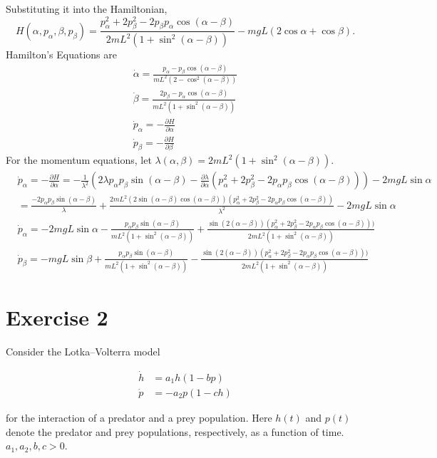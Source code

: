 \documentclass[a4paper,11pt,pdftex]{article}
\begin{document}
Substituting it into the Hamiltonian,
$$
H(\alpha, p_\alpha, \beta, p_\beta) = \frac{p^2_\alpha + 2p^2_\beta - 2p_\beta p_\alpha\cos(\alpha-\beta)}{2mL^2(1+\sin^2(\alpha - \beta))}- mgL(2\cos \alpha + \cos \beta).
$$
Hamilton's Equations are
\begin{align*}
    \dot{\alpha} = \frac{p_\alpha- p_\beta \cos(\alpha-\beta)}{mL^2(2-\cos^2(\alpha - \beta))} \\
    \dot{\beta} = \frac{2p_\beta - p_\alpha \cos(\alpha-\beta)}{mL^2(1+\sin^2(\alpha - \beta))}\\
    \dot{p}_\alpha = -\frac{\partial H}{\partial \alpha} \\
    \dot{p}_\beta = -\frac{\partial H}{\partial \beta} 
\end{align*}
For the momentum equations, let $\lambda(\alpha, \beta) = 2mL^2(1+\sin^2(\alpha - \beta))$.
\begin{align*}
&\dot{p}_\alpha = -\frac{\partial H}{\partial \alpha}= -\frac{1}{\lambda^2}\left(2\lambda p_\alpha p_\beta \sin(\alpha -\beta ) - \frac{\partial \lambda}{\partial \alpha}(p^2_\alpha + 2p^2_\beta-2p_\alpha p_\beta \cos(\alpha-\beta))\right) - 2mgL\sin \alpha \\
& = \frac{-2p_\alpha p_\beta \sin(\alpha - \beta)}{\lambda}+ \frac{2mL^2(2\sin(\alpha-\beta)\cos(\alpha-\beta))(p^2_\alpha + 2p^2_\beta-2p_\alpha p_\beta \cos(\alpha-\beta))}{\lambda^2} - 2mgL\sin \alpha \\
& \dot{p}_\alpha = -2mgL \sin \alpha- \frac{p_\alpha p_\beta \sin(\alpha -\beta)}{mL^2 (1+\sin^2(\alpha-\beta))} + \frac{\sin(2(\alpha-\beta))(p^2_\alpha + 2p^2_\beta-2p_\alpha p_\beta \cos(\alpha-\beta)))}{2mL^2 (1+\sin^2(\alpha-\beta))} \\
&\dot{p}_\beta = -mgL\sin\beta + \frac{p_\alpha p_\beta \sin(\alpha -\beta)}{mL^2 (1+\sin^2(\alpha-\beta))} - \frac{\sin(2(\alpha-\beta))(p^2_\alpha + 2p^2_\beta-2p_\alpha p_\beta \cos(\alpha-\beta)))}{2mL^2 (1+\sin^2(\alpha-\beta))}
\end{align*}


\section*{Exercise 2}
Consider the Lotka–Volterra model

\begin{align*}
    \dot{h} &= a_1 h(1-bp) \\
    \dot{p} &= -a_2p(1-ch)
\end{align*}

for the interaction of a predator and a prey population. Here $h(t)$ and $p(t)$ denote the predator and prey populations, respectively, as a function of time. $a_1, a_2, b, c >0$. 
\end{document}
